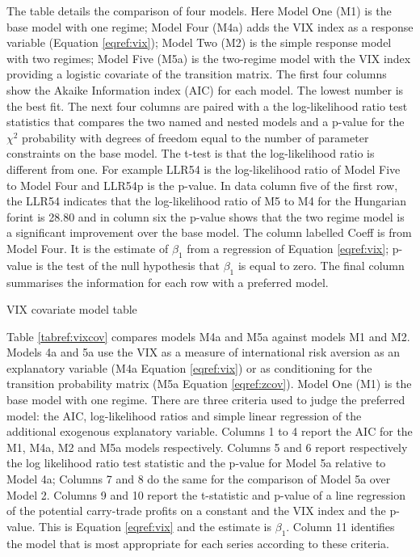 \documentclass[12pt, a4paper, oneside]{article}\usepackage[]{graphicx}\usepackage[]{color}
\begin{document}
\begin{sidewaystable}[p]
\begin{threeparttable}
\begin{tablenotes}
\item The table details the comparison of four models. Here Model  One (M1) is the base model with one regime; Model Four (M4a) adds the VIX index as a response variable (Equation \ref{eqref:vix}); Model Two (M2) is the simple response model with two regimes; Model Five (M5a) is the two-regime model with the VIX index providing a logistic covariate of the transition matrix. The first four columns show the Akaike Information index (AIC) for each model.  The lowest number is the best fit.  The next four columns are paired with a the log-likelihood ratio test statistics that compares the two named and nested models and a p-value for the $\chi^2$ probability with degrees of freedom equal to the number of parameter constraints on the base model. The t-test is that the log-likelihood ratio is different from one.  For example LLR54 is the log-likelihood ratio of Model Five to Model Four and LLR54p is the p-value.  In data column five of the first row, the LLR54 indicates that the log-likelihood ratio of M5 to M4 for the Hungarian forint is 28.80 and in column six the p-value shows that the two regime model is a significant improvement over the base model.  The column labelled Coeff is from Model Four.  It is the estimate of $\beta_1$ from a regression of Equation \ref{eqref:vix}; p-value is the test of the null hypothesis that $\beta_1$ is equal to zero.  The final column summarises the information for each row with a preferred model. 
\end{tablenotes}
\caption{VIX covariate model table}
\label{tabref:vixcov}
\end{threeparttable}
\end{sidewaystable}

Table \ref{tabref:vixcov} compares models M4a and M5a against models M1 and M2.  Models 4a and 5a use the VIX as a measure of international risk aversion as an explanatory variable (M4a Equation \ref{eqref:vix}) or as conditioning for the transition probability matrix (M5a Equation \ref{eqref:zcov}).  Model One (M1) is the base model with one regime. There are three criteria used to judge the preferred model: the AIC, log-likelihood ratios and simple linear regression of the additional exogenous explanatory variable. Columns 1 to 4 report the AIC for the M1, M4a, M2 and M5a models respectively.  Columns 5 and 6 report respectively the log likelihood ratio test statistic and the p-value for Model 5a relative to Model 4a; Columns 7 and 8 do the same for the comparison of Model 5a over Model 2.  Columns 9 and 10 report the t-statistic and p-value of a line regression of the potential carry-trade profits on a constant and the VIX index and the p-value. This is Equation \ref{eqref:vix} and the estimate is $\beta_1$.  Column 11 identifies the model that is most appropriate for each series according to these criteria.
\end{document}
